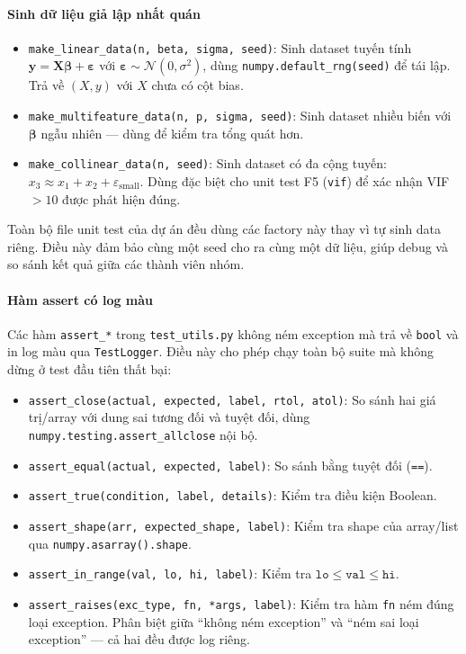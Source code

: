\paragraph{Sinh dữ liệu giả lập nhất quán}

\begin{itemize}
    \item \texttt{make\_linear\_data(n, beta, sigma, seed)}: Sinh dataset tuyến tính $\mathbf{y} = \mathbf{X}\boldsymbol{\beta} + \boldsymbol{\varepsilon}$ với $\boldsymbol{\varepsilon} \sim \mathcal{N}(0, \sigma^2)$, dùng \texttt{numpy.default\_rng(seed)} để tái lập. Trả về $(X, y)$ với $X$ chưa có cột bias.
    \item \texttt{make\_multifeature\_data(n, p, sigma, seed)}: Sinh dataset nhiều biến với $\boldsymbol{\beta}$ ngẫu nhiên --- dùng để kiểm tra tổng quát hơn.
    \item \texttt{make\_collinear\_data(n, seed)}: Sinh dataset có đa cộng tuyến: $x_3 \approx x_1 + x_2 + \varepsilon_{\mathrm{small}}$. Dùng đặc biệt cho unit test F5 (\texttt{vif}) để xác nhận VIF $> 10$ được phát hiện đúng.
\end{itemize}

Toàn bộ file unit test của dự án đều dùng các factory này thay vì tự sinh data riêng. Điều này đảm bảo cùng một seed cho ra cùng một dữ liệu, giúp debug và so sánh kết quả giữa các thành viên nhóm.

\paragraph{Hàm assert có log màu}

Các hàm \texttt{assert\_*} trong \texttt{test\_utils.py} không ném exception mà trả về \texttt{bool} và in log màu qua \texttt{TestLogger}. Điều này cho phép chạy toàn bộ suite mà không dừng ở test đầu tiên thất bại:

\begin{itemize}
    \item \texttt{assert\_close(actual, expected, label, rtol, atol)}: So sánh hai giá trị/array với dung sai tương đối và tuyệt đối, dùng \texttt{numpy.testing.assert\_allclose} nội bộ.
    \item \texttt{assert\_equal(actual, expected, label)}: So sánh bằng tuyệt đối (\texttt{==}).
    \item \texttt{assert\_true(condition, label, details)}: Kiểm tra điều kiện Boolean.
    \item \texttt{assert\_shape(arr, expected\_shape, label)}: Kiểm tra shape của array/list qua \texttt{numpy.asarray().shape}.
    \item \texttt{assert\_in\_range(val, lo, hi, label)}: Kiểm tra $\texttt{lo} \leq \texttt{val} \leq \texttt{hi}$.
    \item \texttt{assert\_raises(exc\_type, fn, *args, label)}: Kiểm tra hàm \texttt{fn} ném đúng loại exception. Phân biệt giữa ``không ném exception'' và ``ném sai loại exception'' --- cả hai đều được log riêng.
\end{itemize}

